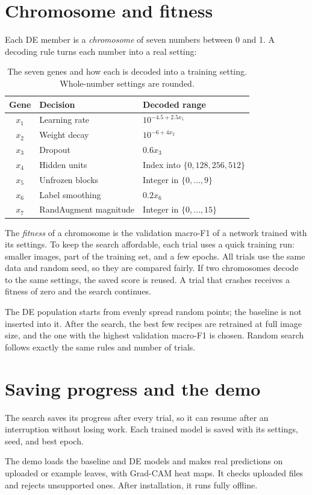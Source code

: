 \section{Chromosome and fitness}
Each DE member is a \emph{chromosome} of seven numbers between 0 and 1. A decoding rule turns each number into a real setting:
\begin{table}[htbp]\centering\small
\caption{The seven genes and how each is decoded into a training setting. Whole-number settings are rounded.}
\begin{tabularx}{\textwidth}{@{}c l X@{}}\toprule
Gene & Decision & Decoded range\\\midrule
$x_1$ & Learning rate & $10^{-4.5+2.5x_1}$\\
$x_2$ & Weight decay & $10^{-6+4x_2}$\\
$x_3$ & Dropout & $0.6x_3$\\
$x_4$ & Hidden units & Index into $\{0,128,256,512\}$\\
$x_5$ & Unfrozen blocks & Integer in $\{0,\ldots,9\}$\\
$x_6$ & Label smoothing & $0.2x_6$\\
$x_7$ & RandAugment magnitude & Integer in $\{0,\ldots,15\}$\\\bottomrule
\end{tabularx}
\end{table}

The \emph{fitness} of a chromosome is the validation macro-F1 of a network trained with its settings. To keep the search affordable, each trial uses a quick training run: smaller images, part of the training set, and a few epochs. All trials use the same data and random seed, so they are compared fairly. If two chromosomes decode to the same settings, the saved score is reused. A trial that crashes receives a fitness of zero and the search continues.

The DE population starts from evenly spread random points; the baseline is not inserted into it. After the search, the best few recipes are retrained at full image size, and the one with the highest validation macro-F1 is chosen. Random search follows exactly the same rules and number of trials.

\section{Saving progress and the demo}
The search saves its progress after every trial, so it can resume after an interruption without losing work. Each trained model is saved with its settings, seed, and best epoch.

The demo loads the baseline and DE models and makes real predictions on uploaded or example leaves, with Grad-CAM heat maps. It checks uploaded files and rejects unsupported ones. After installation, it runs fully offline.
